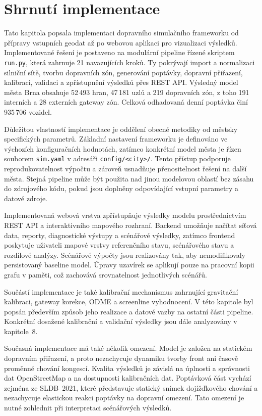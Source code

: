 \section{Shrnutí implementace}
\label{sec:impl-summary}

Tato kapitola popsala implementaci dopravního simulačního frameworku od přípravy vstupních geodat až po webovou aplikaci pro vizualizaci výsledků. Implementované řešení je postaveno na modulární pipeline řízené skriptem \texttt{run.py}, která zahrnuje 21 navazujících kroků. Ty pokrývají import a normalizaci silniční sítě, tvorbu dopravních zón, generování poptávky, dopravní přiřazení, kalibraci, validaci a zpřístupnění výsledků přes REST API. Výsledný model města Brna obsahuje 52\,493 hran, 47\,181 uzlů a 219 dopravních zón, z toho 191 interních a 28 externích gateway zón. Celková odhadovaná denní poptávka činí 935\,706 vozidel.

Důležitou vlastností implementace je oddělení obecné metodiky od městsky specifických parametrů. Základní nastavení frameworku je definováno ve výchozích konfiguračních hodnotách, zatímco konkrétní model města je řízen souborem \texttt{sim.yaml} v adresáři \texttt{config/<city>/}. Tento přístup podporuje reprodukovatelnost výpočtu a zároveň usnadňuje přenositelnost řešení na další města. Stejná pipeline může být použita nad jinou modelovou oblastí bez zásahu do zdrojového kódu, pokud jsou doplněny odpovídající vstupní parametry a datové zdroje.

Implementovaná webová vrstva zpřístupňuje výsledky modelu prostřednictvím REST API a interaktivního mapového rozhraní. Backend umožňuje načítat síťová data, reporty, diagnostické výstupy a scénářové výsledky, zatímco frontend poskytuje uživateli mapové vrstvy referenčního stavu, scénářového stavu a rozdílové analýzy. Scénářové výpočty jsou realizovány tak, aby nemodifikovaly persistovaný baseline model. Úpravy uzavírek se aplikují pouze na pracovní kopii grafu v paměti, což zachovává srovnatelnost jednotlivých scénářů.

Součástí implementace je také kalibrační mechanismus zahrnující gravitační kalibraci, gateway korekce, ODME a screenline vyhodnocení. V této kapitole byl popsán především způsob jeho realizace a datové vazby na ostatní části pipeline. Konkrétní dosažené kalibrační a validační výsledky jsou dále analyzovány v kapitole~8.

Současná implementace má také několik omezení. Model je založen na statickém dopravním přiřazení, a proto nezachycuje dynamiku tvorby front ani časově proměnné chování kongescí. Kvalita výsledků je závislá na úplnosti a správnosti dat OpenStreetMap a na dostupnosti kalibračních dat. Poptávková část vychází zejména ze SLDB~2021, které představuje statický snímek dojížďkového chování a nezachycuje elastickou reakci poptávky na dopravní omezení. Tato omezení je nutné zohlednit při interpretaci scénářových výsledků.

